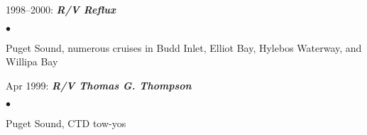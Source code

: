 \documentclass[11pt]{res}
\newenvironment{list2}{
  \begin{list}{$\bullet$}{%
      \setlength{\itemsep}{0in}
      \setlength{\parsep}{0in} \setlength{\parskip}{0in}
      \setlength{\topsep}{0in} \setlength{\partopsep}{0in} 
      \setlength{\leftmargin}{0.2in}}}{\end{list}}
\begin{document}
\begin{resume}
\vspace*{-.1in}
1998--2000: {\bf\em R/V Reflux}
\begin{list2}
\item Puget Sound, numerous cruises in Budd Inlet, Elliot Bay, Hylebos Waterway, and
Willipa Bay
\end{list2}

\vspace*{-.1in}
Apr 1999: {\bf\em R/V Thomas G. Thompson}
\begin{list2}
\item Puget Sound, CTD tow-yos
\end{list2}

\end{resume}
\end{document}
